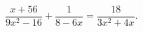 \begin{ex}[type=equation]
	\begin{condition}
		$\dfrac{x + 56}{9x^2 - 16} + \dfrac{1}{8 - 6x} = \dfrac{18}{3x^2 + 4x}.$
	\end{condition}
\end{ex}